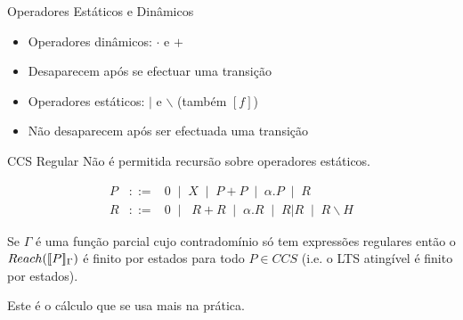 \documentclass[aspectratio=169]{beamer}
\begin{document}
\begin{frame}{Operadores Estáticos e Dinâmicos}
\begin{itemize}[<+->]
	\item \alert{Operadores dinâmicos}: $\cdot$ e $+$
\item Desaparecem após se efectuar uma transição

\item  \alert{Operadores estáticos}: $|$ e $\backslash$ (também $[f]$)
\item Não desaparecem após ser efectuada uma transição

\end{itemize}
	
\end{frame}
\begin{frame}{CCS Regular}
Não é permitida recursão sobre operadores estáticos.

\begin{eqnarray*}
P&::=& 0 \;\mid\; X \;\mid \;P+P\;  \mid \;\alpha.P\;\mid\;  R\\
R&::=& 0 \;\mid\; \;R+R\;  \mid \;\alpha.R\;\mid\;  R | R \;\mid\; R\backslash H 
\end{eqnarray*}	
\pause
\begin{propos}
Se $\Gamma$ é uma função parcial cujo contradomínio só tem expressões regulares então o $Reach([\![ P ]\!]_\Gamma)$  é   finito por estados para todo $P\in CCS$ (i.e. o LTS atingível é finito por estados).	
\end{propos}
\pause Este é o cálculo que se usa  mais na prática.
\end{frame}
\end{document}

